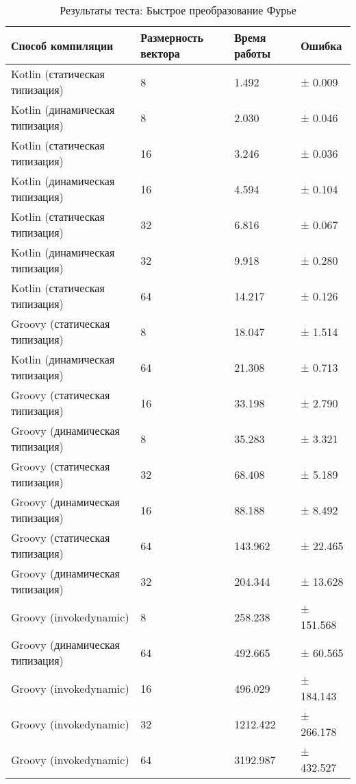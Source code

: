 \begin{table}[h]
\caption{\label{tab:fftResults}Результаты теста: Быстрое преобразование Фурье}
\begin{center}
\begin{tabular}{|l|p{}|l|l|}
\hline
Способ компиляции & Размерность вектора	& Время работы & Ошибка \\
\hline
Kotlin (статическая типизация)  &  8 &    1.492 & ±   0.009 \\
Kotlin (динамическая типизация) &  8 &    2.030 & ±   0.046 \\
Kotlin (статическая типизация)  & 16 &    3.246 & ±   0.036 \\
Kotlin (динамическая типизация) & 16 &    4.594 & ±   0.104 \\
Kotlin (статическая типизация)  & 32 &    6.816 & ±   0.067 \\
Kotlin (динамическая типизация) & 32 &    9.918 & ±   0.280 \\
Kotlin (статическая типизация)  & 64 &   14.217 & ±   0.126 \\
Groovy (статическая типизация)  &  8 &   18.047 & ±   1.514 \\
Kotlin (динамическая типизация) & 64 &   21.308 & ±   0.713 \\
Groovy (статическая типизация)  & 16 &   33.198 & ±   2.790 \\
Groovy (динамическая типизация) &  8 &   35.283 & ±   3.321 \\
Groovy (статическая типизация)  & 32 &   68.408 & ±   5.189 \\
Groovy (динамическая типизация) & 16 &   88.188 & ±   8.492 \\
Groovy (статическая типизация)  & 64 &  143.962 & ±  22.465 \\
Groovy (динамическая типизация) & 32 &  204.344 & ±  13.628 \\
Groovy (invokedynamic)          &  8 &  258.238 & ± 151.568 \\
Groovy (динамическая типизация) & 64 &  492.665 & ±  60.565 \\
Groovy (invokedynamic)          & 16 &  496.029 & ± 184.143 \\
Groovy (invokedynamic)          & 32 & 1212.422 & ± 266.178 \\
Groovy (invokedynamic)          & 64 & 3192.987 & ± 432.527 \\
\hline
\end{tabular}
\end{center}
\end{table} 

